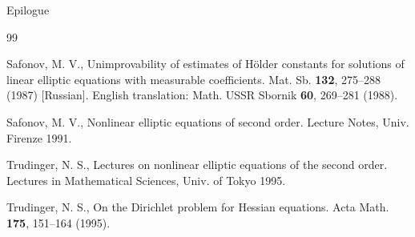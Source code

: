 Epilogue

\begin{thebibliography}{99}

 Safonov, M. V., Unimprovability of estimates of Hölder constants for solutions of linear elliptic equations with measurable coefficients. Mat. Sb. \textbf{132}, 275--288 (1987) [Russian]. English translation: Math. USSR Sbornik \textbf{60}, 269--281 (1988).

 Safonov, M. V., Nonlinear elliptic equations of second order. Lecture Notes, Univ. Firenze 1991.

 Trudinger, N. S., Lectures on nonlinear elliptic equations of the second order. Lectures in Mathematical Sciences, Univ. of Tokyo 1995.

 Trudinger, N. S., On the Dirichlet problem for Hessian equations. Acta Math. \textbf{175}, 151--164 (1995).

\end{thebibliography}

